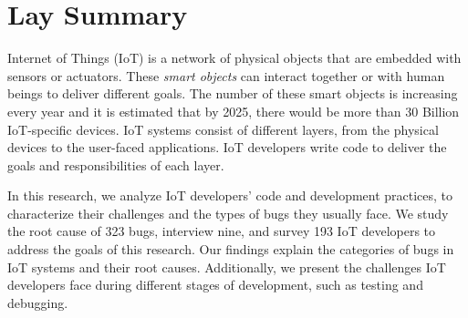 

\chapter{Lay Summary}

Internet of Things (IoT) is a network of physical objects that are embedded with sensors or actuators. These \textit{smart objects} can interact together or with human beings to deliver different goals. The number of these smart objects is increasing every year and it is estimated that by 2025, there would be more than 30 Billion IoT-specific devices. IoT systems consist of different layers, from the physical devices to the user-faced applications. IoT developers write code to deliver the goals and responsibilities of each layer. 

In this research, we analyze IoT developers' code and development practices, to characterize their challenges and the types of bugs they usually face. We study the root cause of 323 bugs, interview nine, and survey 193 IoT developers to address the goals of this research. Our findings explain the categories of bugs in IoT systems and their root causes. Additionally, we present the challenges IoT developers face during different stages of development, such as testing and debugging.
